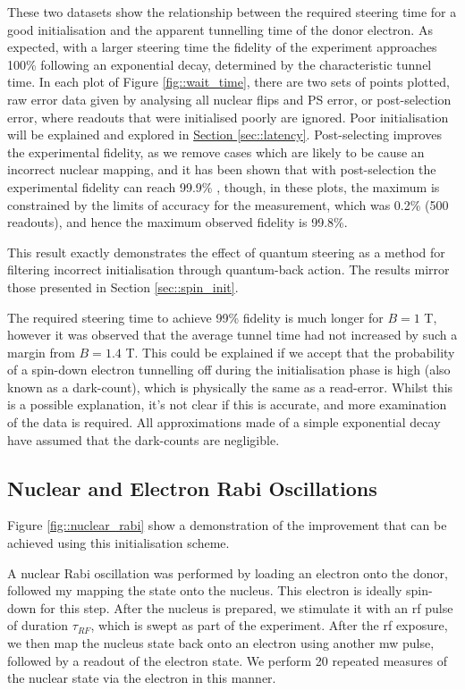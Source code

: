 	These two datasets show the relationship between the required steering time for a good initialisation and the apparent tunnelling time of the donor electron. As expected, with a larger steering time the fidelity of the experiment approaches 100\% following an exponential decay, determined by the characteristic tunnel time. In each plot of Figure \ref{fig::wait_time}, there are two sets of points plotted, raw error data given by analysing all nuclear flips and PS error, or post-selection error, where readouts that were initialised poorly are ignored. Poor initialisation will be explained and explored in \hyperref[sec::latency]{Section \ref{sec::latency}}. Post-selecting improves the experimental fidelity, as we remove cases which are likely to be cause an incorrect nuclear mapping, and it has been shown that with post-selection the experimental fidelity can reach 99.9\% , though, in these plots, the maximum is constrained by the limits of accuracy for the measurement, which was 0.2\% (500 readouts), and hence the maximum observed fidelity is 99.8\%.

	This result exactly demonstrates the effect of quantum steering as a method for filtering incorrect initialisation through quantum-back action. The results mirror those presented in Section \ref{sec::spin_init}.
	
	The required steering time to achieve 99\% fidelity is much longer for $B = 1$ T, however it was observed that the average tunnel time had not increased by such a margin from $B = 1.4$ T. This could be explained if we accept that the probability of a spin-down electron tunnelling off during the initialisation phase is high (also known as a dark-count), which is physically the same as a read-error. Whilst this is a possible explanation, it's not clear if this is accurate, and more examination of the data is required. All approximations made of a simple exponential decay have assumed that the dark-counts are negligible.

\subsection{Nuclear and Electron Rabi Oscillations}
	Figure \ref{fig::nuclear_rabi} show a demonstration of the improvement that can be achieved using this initialisation scheme.
	
	A nuclear Rabi oscillation was performed by loading an electron onto the donor, followed my mapping the state onto the nucleus. This electron is ideally spin-down for this step. After the nucleus is prepared, we stimulate it with an \gls{rf} pulse of duration $\tau_{RF}$, which is swept as part of the experiment. After the \gls{rf} exposure, we then map the nucleus state back onto an electron using another \gls{mw} pulse, followed by a readout of the electron state. We perform 20 repeated measures of the nuclear state via the electron in this manner.
	
